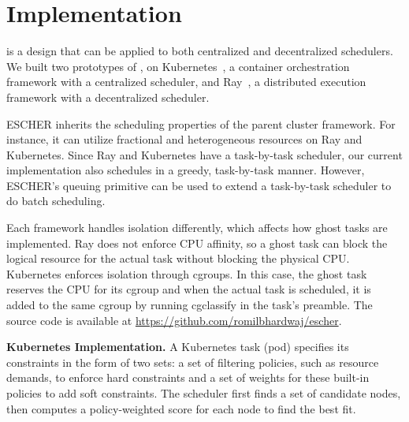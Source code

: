 \section{Implementation}
\label{sec:impl}
\name{} is a design that can be applied to both centralized and decentralized schedulers.
We built two prototypes of \name{}, on Kubernetes~\cite{kubernetes}, a container orchestration framework with a centralized scheduler, and Ray~\cite{ray}, a distributed execution framework with a decentralized scheduler.

ESCHER inherits the scheduling properties of the parent cluster framework. For instance, it can utilize fractional and heterogeneous resources on Ray and Kubernetes. Since Ray and Kubernetes have a task-by-task scheduler, our current implementation also schedules in a greedy, task-by-task manner. However, ESCHER's queuing primitive can be used to extend a task-by-task scheduler to do batch scheduling.

Each framework handles isolation differently, which affects how ghost tasks are implemented. Ray does not enforce CPU affinity, so a ghost task can block the logical resource for the actual task without blocking the physical CPU. Kubernetes enforces isolation through cgroups. In this case, the ghost task reserves the CPU for its cgroup and when the actual task is scheduled, it is added to the same cgroup by running cgclassify in the task's preamble.
The source code is available at \href{https://github.com/romilbhardwaj/escher}{https://github.com/romilbhardwaj/escher}.

\noindent\textbf{Kubernetes Implementation.}
A Kubernetes task (pod) specifies its constraints in the form of two sets: a set of filtering policies, such as resource demands, to enforce hard constraints and a set of weights for these built-in policies to add soft constraints.
The scheduler first finds a set of candidate nodes, then computes a policy-weighted score for each node to find the best fit.

